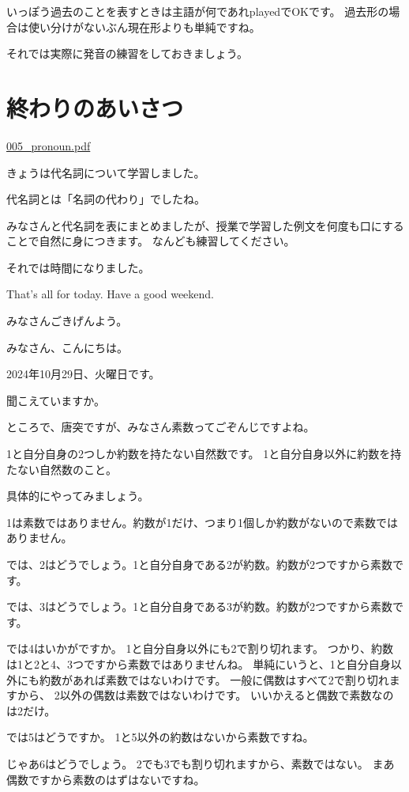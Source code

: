 \documentclass[12pt,jafontscale=0.9247]{jlreq}
\begin{document}
いっぽう過去のことを表すときは主語が何であれplayedでOKです。
過去形の場合は使い分けがないぶん現在形よりも単純ですね。

それでは実際に発音の練習をしておきましょう。




 \section{終わりのあいさつ}

\hfill\url{005_pronoun.pdf}

きょうは代名詞について学習しました。

代名詞とは「名詞の代わり」でしたね。

みなさんと代名詞を表にまとめましたが、授業で学習した例文を何度も口にすることで自然に身につきます。
なんども練習してください。

それでは時間になりました。

That's all for today.
Have a good weekend.

みなさんごきげんよう。





\newpage
\large
みなさん、こんにちは。

2024年10月29日、火曜日です。

聞こえていますか。

ところで、唐突ですが、みなさん素数ってごぞんじですよね。

1と自分自身の2つしか約数を持たない自然数です。
1と自分自身以外に約数を持たない自然数のこと。

具体的にやってみましょう。

1は素数ではありません。約数が1だけ、つまり1個しか約数がないので素数ではありません。

では、2はどうでしょう。1と自分自身である2が約数。約数が2つですから素数です。

では、3はどうでしょう。1と自分自身である3が約数。約数が2つですから素数です。

では4はいかがですか。
1と自分自身以外にも2で割り切れます。
つかり、約数は1と2と4、3つですから素数ではありませんね。
単純にいうと、1と自分自身以外にも約数があれば素数ではないわけです。
一般に偶数はすべて2で割り切れますから、
2以外の偶数は素数ではないわけです。
いいかえると偶数で素数なのは2だけ。

では5はどうですか。
1と5以外の約数はないから素数ですね。

じゃあ6はどうでしょう。
2でも3でも割り切れますから、素数ではない。
まあ偶数ですから素数のはずはないですね。
\end{document}
